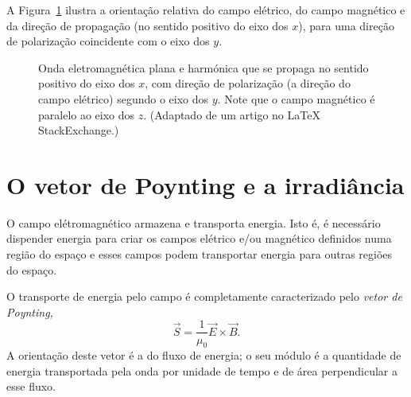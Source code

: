 A Figura~\ref{fig:plemwave} ilustra a orientação relativa do campo elétrico, do
campo magnético e da direção de propagação (no sentido positivo do eixo dos
$x$), para uma direção de polarização coincidente com o eixo dos $y$.
\begin{figure}[htb]
  {\centering
      \par
    }
    \caption{Onda eletromagnética plana e harmónica que se propaga no sentido
    positivo do eixo dos $x$, com direção de polarização (a direção do campo
  elétrico) segundo o eixo dos $y$. Note que o campo magnético é paralelo ao
  eixo dos $z$.  (Adaptado de um artigo no \LaTeX{}
  StackExchange.)\label{fig:plemwave}}
\end{figure}

\section{O vetor de Poynting e a irradiância}
O campo elétromagnético armazena e transporta energia. Isto é, é necessário
dispender energia para criar os campos elétrico e/ou magnético definidos numa
região do espaço e esses campos podem transportar energia para outras regiões do
espaço. 

O transporte de energia pelo campo é completamente caracterizado pelo
\emph{vetor de Poynting,}
\begin{equation}
  \vec S=\frac{1}{\mu_0}\vec E\times\vec B.
\end{equation}
A orientação deste vetor é a do fluxo de energia; o seu módulo é a quantidade de
energia transportada pela onda por unidade de tempo e de área perpendicular a
esse fluxo.

